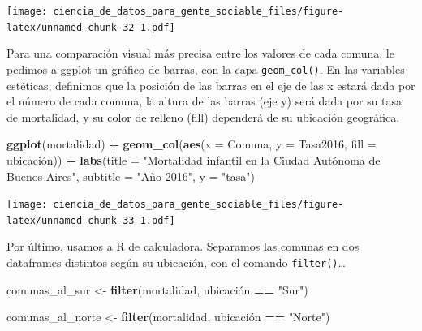 \documentclass[]{book}
\newenvironment{Shaded}{\begin{snugshade}}{\end{snugshade}}
\newcommand{\KeywordTok}[1]{\textcolor[rgb]{0.13,0.29,0.53}{\textbf{#1}}}
\newcommand{\DataTypeTok}[1]{\textcolor[rgb]{0.13,0.29,0.53}{#1}}
\newcommand{\StringTok}[1]{\textcolor[rgb]{0.31,0.60,0.02}{#1}}
\newcommand{\OperatorTok}[1]{\textcolor[rgb]{0.81,0.36,0.00}{\textbf{#1}}}
\newcommand{\NormalTok}[1]{#1}
\begin{document}
\begin{Shaded}
\end{Shaded}

\texttt{[image: ciencia\_de\_datos\_para\_gente\_sociable\_files/figure-latex/unnamed-chunk-32-1.pdf]}

Para una comparación visual más precisa entre los valores de cada
comuna, le pedimos a ggplot un gráfico de barras, con la capa
\texttt{geom\_col()}. En las variables estéticas, definimos que la
posición de las barras en el eje de las x estará dada por el número de
cada comuna, la altura de las barras (eje y) será dada por su tasa de
mortalidad, y su color de relleno (fill) dependerá de su ubicación
geográfica.

\begin{Shaded}
\begin{Highlighting}[]
\KeywordTok{ggplot}\NormalTok{(mortalidad) }\OperatorTok{+}
\StringTok{    }\KeywordTok{geom_col}\NormalTok{(}\KeywordTok{aes}\NormalTok{(}\DataTypeTok{x =}\NormalTok{ Comuna, }\DataTypeTok{y =}\NormalTok{ Tasa2016, }\DataTypeTok{fill =}\NormalTok{ ubicación)) }\OperatorTok{+}
\StringTok{    }\KeywordTok{labs}\NormalTok{(}\DataTypeTok{title =} \StringTok{"Mortalidad infantil en la Ciudad Autónoma de Buenos Aires"}\NormalTok{,}
         \DataTypeTok{subtitle =} \StringTok{"Año 2016"}\NormalTok{,}
         \DataTypeTok{y =} \StringTok{"tasa"}\NormalTok{) }
\end{Highlighting}
\end{Shaded}

\texttt{[image: ciencia\_de\_datos\_para\_gente\_sociable\_files/figure-latex/unnamed-chunk-33-1.pdf]}

Por último, usamos a R de calculadora. Separamos las comunas en dos
dataframes distintos según su ubicación, con el comando
\texttt{filter()}\ldots{}

\begin{Shaded}
\begin{Highlighting}[]
\NormalTok{comunas_al_sur <-}\StringTok{ }\KeywordTok{filter}\NormalTok{(mortalidad, ubicación }\OperatorTok{==}\StringTok{ "Sur"}\NormalTok{)}

\NormalTok{comunas_al_norte <-}\StringTok{ }\KeywordTok{filter}\NormalTok{(mortalidad, ubicación }\OperatorTok{==}\StringTok{ "Norte"}\NormalTok{)}
\end{Highlighting}
\end{Shaded}
\end{document}
